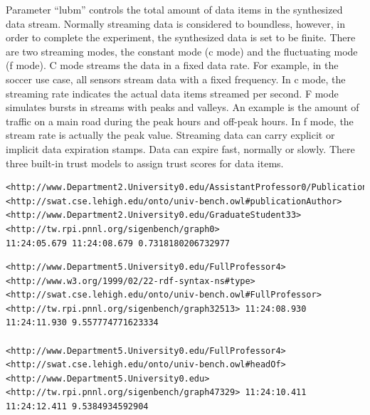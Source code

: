 Parameter ``lubm'' controls the total amount of data items in the synthesized data stream. 
Normally streaming data is considered to boundless, however, in order to complete the experiment, the synthesized data is set to be finite. 
There are two streaming modes, the constant mode (c mode) and the fluctuating mode (f mode).
C mode streams the data in a fixed data rate.
For example, in the soccer use case, all sensors stream data with a fixed frequency.
In c mode, the streaming rate indicates the actual data items streamed per second. 
F mode simulates bursts in streams with peaks and valleys. 
An example is the amount of traffic on a main road during the peak hours and off-peak hours. 
In f mode, the stream rate is actually the peak value. 
Streaming data can carry explicit or implicit data expiration stamps.
Data can expire fast, normally or slowly.
There three built-in trust models to assign trust scores for data items.

\begin{lstlisting}[caption={\textbf{Generated RDF Stream Example 1}},basicstyle=\tiny]
<http://www.Department2.University0.edu/AssistantProfessor0/Publication7> 
<http://swat.cse.lehigh.edu/onto/univ-bench.owl#publicationAuthor>
<http://www.Department2.University0.edu/GraduateStudent33> 
<http://tw.rpi.pnnl.org/sigenbench/graph0> 
11:24:05.679 11:24:08.679 0.7318180206732977
\end{lstlisting}

\begin{lstlisting}[caption={\textbf{Generated RDF Stream Example 2}},basicstyle=\tiny]
<http://www.Department5.University0.edu/FullProfessor4>
<http://www.w3.org/1999/02/22-rdf-syntax-ns#type>
<http://swat.cse.lehigh.edu/onto/univ-bench.owl#FullProfessor>
<http://tw.rpi.pnnl.org/sigenbench/graph32513> 11:24:08.930 11:24:11.930 9.557774771623334

<http://www.Department5.University0.edu/FullProfessor4>
<http://swat.cse.lehigh.edu/onto/univ-bench.owl#headOf>
<http://www.Department5.University0.edu>
<http://tw.rpi.pnnl.org/sigenbench/graph47329> 11:24:10.411 11:24:12.411 9.5384934592904
\end{lstlisting}


